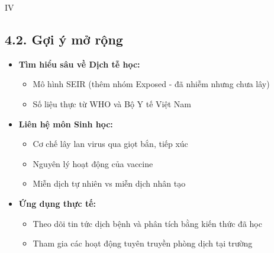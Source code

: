 \documentclass[12pt,a4paper]{article}
\begin{document}
\begin{competitionsection}{IV}
\subsection*{4.2. Gợi ý mở rộng}
\begin{itemize}[leftmargin=*,noitemsep]
\item \textbf{Tìm hiểu sâu về Dịch tễ học:}
    \begin{itemize}
    \item Mô hình SEIR (thêm nhóm Exposed - đã nhiễm nhưng chưa lây)
    \item Số liệu thực từ WHO và Bộ Y tế Việt Nam
    \end{itemize}
\item \textbf{Liên hệ môn Sinh học:}
    \begin{itemize}
    \item Cơ chế lây lan virus qua giọt bắn, tiếp xúc
    \item Nguyên lý hoạt động của vaccine
    \item Miễn dịch tự nhiên vs miễn dịch nhân tạo
    \end{itemize}
\item \textbf{Ứng dụng thực tế:}
    \begin{itemize}
    \item Theo dõi tin tức dịch bệnh và phân tích bằng kiến thức đã học
    \item Tham gia các hoạt động tuyên truyền phòng dịch tại trường
    \end{itemize}
\end{itemize}
\end{competitionsection}
\newpage
\end{document}
